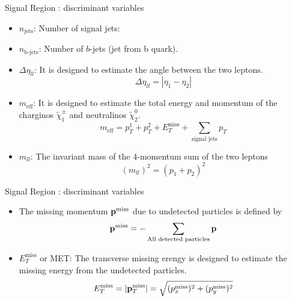 \documentclass[mathserif,serif]{beamer}
\begin{document}
\begin{frame}{Signal Region : discriminant variables}
\begin{itemize}
\item $n_{\text{jets}}$: Number of signal jets:
\item $n_{\text{b-jets}}$: Number of $b$-jets (jet from b quark).
\item $\Delta \eta_{ll}$: It is designed to estimate the angle between the two leptons.
\begin{equation*}
\Delta \eta_{ll} = |\eta_{1} - \eta_{2}|
\end{equation*}
\item $m_{\text{eff}}$: It is designed to estimate the total energy and momentum of the charginos $\tilde{\chi}_1^\pm$ and neutralinos $\tilde{\chi}_2^0$.
\begin{equation*}
m_{\text{eff}} = p_T^1 + p_T^2 + E_T^{\text{miss}} + \sum_{\text {signal jets}} p_T
\end{equation*}
\item $m_{ll}$: The invariant mass of the 4-momentum sum of the two leptons
\begin{equation*}
(m_{ll})^2 = (p_1 + p_2)^2
\end{equation*}
\end{itemize}
\end{frame}

\begin{frame}{Signal Region : discriminant variables}
\begin{itemize}
\item The missing momentum ${\bf p}^{\text{miss}}$ due to undetected particles is defined by
\begin{equation*}
{\bf p}^{\text{miss}} = - \sum_{\text{All detected particles}}{\bf p}
\end{equation*}
\item $E_{T}^{\text{miss}}$ or MET: The transverse missing erengy is designed to estimate the missing energy from the undetected particles.
\begin{equation*}
E_{T}^{\text{miss}} = |{\bf p}_T^{\text{miss}}| = \sqrt{ (p_x^{\text{miss}})^2 + (p_y^{\text{miss}})^2}
\end{equation*}
\end{itemize}
\end{frame}
\end{document}
